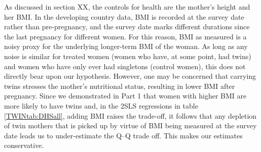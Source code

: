 \documentclass[subeqn]{article}
\begin{document}
\begin{spacing}{1.4}
As discussed in section XX, the controls for health are the mother's height and her BMI. In the developing country data, BMI is recorded at the survey date rather than pre-pregnancy, and the survey date marks different durations since the last pregnancy for different women. For this reason, BMI as measured is a noisy proxy for the underlying longer-term BMI of the woman. As long as any noise is similar for treated women (women who have, at some point, had twins) and women who have only ever had singletons (control women), this does not directly bear upon our hypothesis. However, one may be concerned that carrying twins stresses the mother's nutritional status, resulting in lower BMI after pregnancy. Since we demonstrated in Part 1 that women with higher BMI are more likely to have twins and, in the 2SLS regressions in table \ref{TWINtab:DHSall}, adding BMI raises the trade-off, it follows that any depletion of twin mothers that is picked up by virtue of BMI being measured at the survey date leads us to under-estimate the Q--Q trade off. This makes our estimates conservative.    


\end{spacing}
\end{document}

